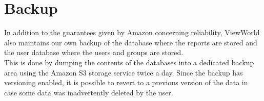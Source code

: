 \documentclass[a4paper, 12pt, final]{article}
\begin{document}
\section{Backup}
In addition to the guarantees given by Amazon concerning reliability,
ViewWorld also maintains our own backup of the database where the
reports are stored and the user database where the users and groups
are stored.\\
This is done by dumping the contents of the databases into a dedicated
backup area using the Amazon S3 storage service twice a day. Since the
backup has versioning enabled, it is possible to revert to a previous
version of the data in case some data was inadvertently deleted by the
user.
\end{document}
